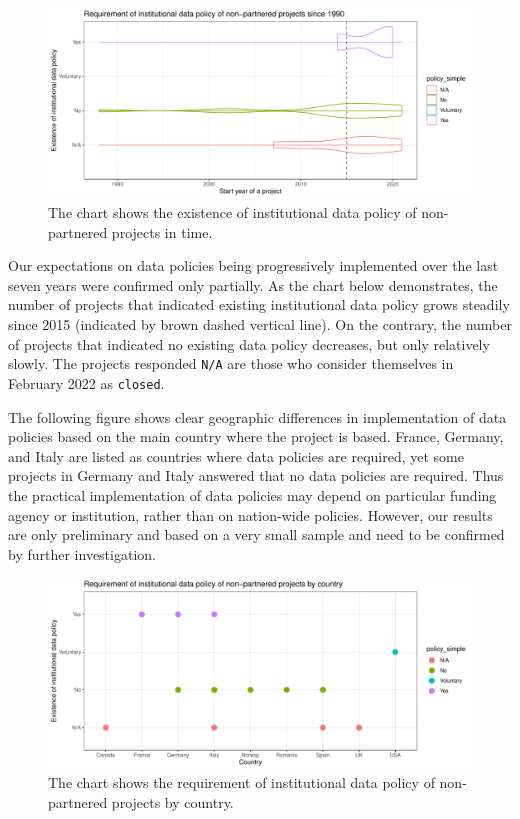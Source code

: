 \documentclass[
  12pt,
]{scrreprt}
\begin{document}
\begin{figure}

{\centering \includegraphics{01_FAIR_epi_report_files/figure-latex/unnamed-chunk-37-1} 

}

\caption{The chart shows the existence of institutional data policy of non-partnered projects in time.}\label{fig:unnamed-chunk-37}
\end{figure}

Our expectations on data policies being progressively implemented over
the last seven years were confirmed only partially. As the chart below
demonstrates, the number of projects that indicated existing
institutional data policy grows steadily since 2015 (indicated by brown
dashed vertical line). On the contrary, the number of projects that
indicated no existing data policy decreases, but only relatively slowly.
The projects responded \texttt{N/A} are those who consider themselves in
February 2022 as \texttt{closed}.

The following figure shows clear geographic differences in
implementation of data policies based on the main country where the
project is based. France, Germany, and Italy are listed as countries
where data policies are required, yet some projects in Germany and Italy
answered that no data policies are required. Thus the practical
implementation of data policies may depend on particular funding agency
or institution, rather than on nation-wide policies. However, our
results are only preliminary and based on a very small sample and need
to be confirmed by further investigation.

\begin{figure}

{\centering \includegraphics{01_FAIR_epi_report_files/figure-latex/unnamed-chunk-39-1} 

}

\caption{The chart shows the requirement of institutional data policy of non-partnered projects by country.}\label{fig:unnamed-chunk-39}
\end{figure}
\end{document}

